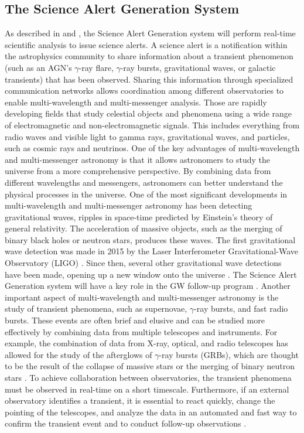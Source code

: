 \subsection{The Science Alert Generation System}
\label{s:sag}
As described in \cite{bulgarelli2015on} and \cite{Bulgarelli_2021}, the Science Alert Generation system will perform real-time scientific analysis to issue science alerts. A science alert is a notification within the astrophysics community to share information about a transient phenomenon (such as an AGN's $\gamma$-ray flare, $\gamma$-ray bursts, gravitational waves, or galactic transients) that has been observed. Sharing this information through specialized communication networks allows coordination among different observatories to enable multi-wavelength and multi-messenger analysis. Those are rapidly developing fields that study celestial objects and phenomena using a wide range of electromagnetic and non-electromagnetic signals. This includes everything from radio waves and visible light to gamma rays, gravitational waves, and particles, such as cosmic rays and neutrinos. One of the key advantages of multi-wavelength and multi-messenger astronomy is that it allows astronomers to study the universe from a more comprehensive perspective. By combining data from different wavelengths and messengers, astronomers can better understand the physical processes in the universe. One of the most significant developments in multi-wavelength and multi-messenger astronomy has been detecting gravitational waves, ripples in space-time predicted by Einstein's theory of general relativity. The acceleration of massive objects, such as the merging of binary black holes or neutron stars, produces these waves. The first gravitational wave detection was made in 2015 by the Laser Interferometer Gravitational-Wave Observatory (LIGO) \cite{gw_061102}. Since then, several other gravitational wave detections have been made, opening up a new window onto the universe \cite{abbott2016observation}. The Science Alert Generation system will have a key role in the GW follow-up program \cite{seglar2019gravitational}. Another important aspect of multi-wavelength and multi-messenger astronomy is the study of transient phenomena, such as supernovae, $\gamma$-ray bursts, and fast radio bursts. These events are often brief and elusive and can be studied more effectively by combining data from multiple telescopes and instruments. For example, the combination of data from X-ray, optical, and radio telescopes has allowed for the study of the afterglows of $\gamma$-ray bursts (GRBs), which are thought to be the result of the collapse of massive stars or the merging of binary neutron stars \cite{Fishman1995}.
To achieve collaboration between observatories, the transient phenomena must be observed in real-time on a short timescale. Furthermore, if an external observatory identifies a transient, it is essential to react quickly, change the pointing of the telescopes, and analyze the data in an automated and fast way to confirm the transient event and to conduct follow-up observations \cite{Bulgarelli_2021}. 

